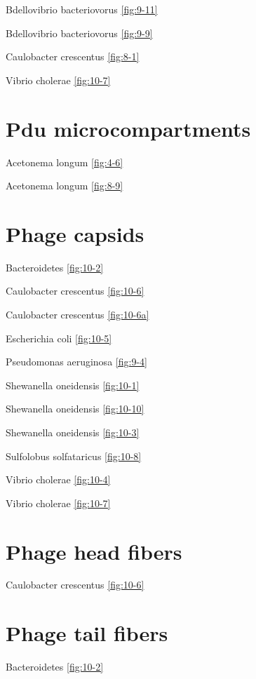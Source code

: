 \documentclass[]{tufte-book}
\begin{document}
Bdellovibrio bacteriovorus \ref{fig:9-11}

Bdellovibrio bacteriovorus \ref{fig:9-9}

Caulobacter crescentus \ref{fig:8-1}

Vibrio cholerae \ref{fig:10-7}

\section{\texorpdfstring{\textbf{Pdu
microcompartments}}{Pdu microcompartments}}\label{pdu-microcompartments}

Acetonema longum \ref{fig:4-6}

Acetonema longum \ref{fig:8-9}

\section{\texorpdfstring{\textbf{Phage
capsids}}{Phage capsids}}\label{phage-capsids}

Bacteroidetes \ref{fig:10-2}

Caulobacter crescentus \ref{fig:10-6}

Caulobacter crescentus \ref{fig:10-6a}

Escherichia coli \ref{fig:10-5}

Pseudomonas aeruginosa \ref{fig:9-4}

Shewanella oneidensis \ref{fig:10-1}

Shewanella oneidensis \ref{fig:10-10}

Shewanella oneidensis \ref{fig:10-3}

Sulfolobus solfataricus \ref{fig:10-8}

Vibrio cholerae \ref{fig:10-4}

Vibrio cholerae \ref{fig:10-7}

\section{\texorpdfstring{\textbf{Phage head
fibers}}{Phage head fibers}}\label{phage-head-fibers}

Caulobacter crescentus \ref{fig:10-6}

\section{\texorpdfstring{\textbf{Phage tail
fibers}}{Phage tail fibers}}\label{phage-tail-fibers}

Bacteroidetes \ref{fig:10-2}
\end{document}
